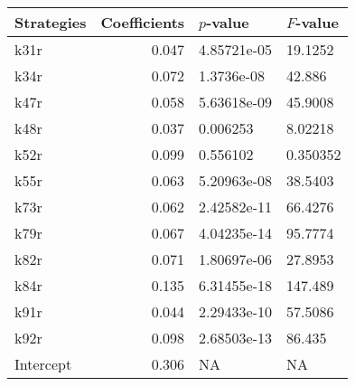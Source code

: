\begin{tabular}{lrll}
\toprule
Strategies &  Coefficients &    $p$-value & $F$-value \\
\midrule
      k31r &         0.047 &  4.85721e-05 &   19.1252 \\
      k34r &         0.072 &   1.3736e-08 &    42.886 \\
      k47r &         0.058 &  5.63618e-09 &   45.9008 \\
      k48r &         0.037 &     0.006253 &   8.02218 \\
      k52r &         0.099 &     0.556102 &  0.350352 \\
      k55r &         0.063 &  5.20963e-08 &   38.5403 \\
      k73r &         0.062 &  2.42582e-11 &   66.4276 \\
      k79r &         0.067 &  4.04235e-14 &   95.7774 \\
      k82r &         0.071 &  1.80697e-06 &   27.8953 \\
      k84r &         0.135 &  6.31455e-18 &   147.489 \\
      k91r &         0.044 &  2.29433e-10 &   57.5086 \\
      k92r &         0.098 &  2.68503e-13 &    86.435 \\
 Intercept &         0.306 &           NA &        NA \\
\bottomrule
\end{tabular}
